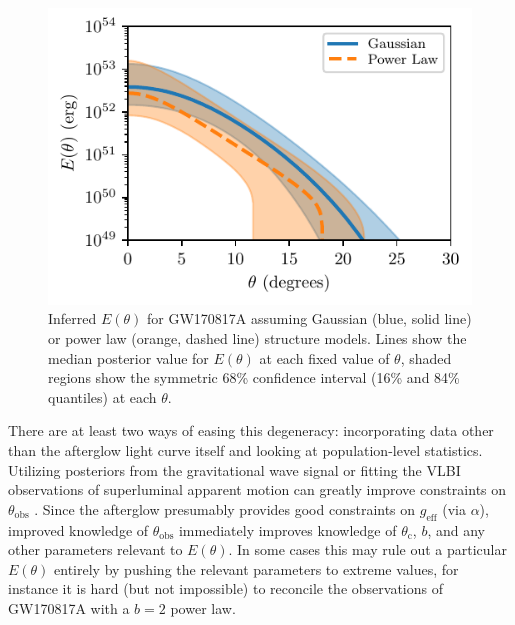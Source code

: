 \documentclass[twocolumn]{aastex62}
\newcommand{\gwbns}{GW170817A}
\newcommand{\thobs}{\ensuremath{\theta_{\mathrm{obs}}}}
\newcommand{\thC}{\ensuremath{\theta_{\mathrm{c}}}}
\newcommand{\geff}{\ensuremath{g_{\mathrm{eff}}}}
\begin{document}
\begin{figure}
	\includegraphics[width=\columnwidth]{figs/fit_E_theta.pdf}
	\caption{Inferred $E(\theta)$ for \gwbns{} assuming Gaussian (blue, solid line) or power law (orange, dashed line) structure models.  Lines show the median posterior value for $E(\theta)$ at each fixed value of $\theta$, shaded regions show the symmetric 68\% confidence interval (16\% and 84\% quantiles) at each $\theta$. \label{fig:fit_E_theta.pdf}}
\end{figure}

There are at least two ways of easing this degeneracy: incorporating data other than the afterglow light curve itself and looking at population-level statistics.  Utilizing posteriors from the gravitational wave signal or fitting the VLBI observations of superluminal apparent motion can greatly improve constraints on $\thobs$ \citep{Troja:2018aa, Hotokezaka:2018aa, Ghirlanda:2019aa}.  Since the afterglow presumably provides good constraints on $\geff$ (via $\alpha$), improved knowledge of $\thobs$ immediately improves knowledge of $\thC$, $b$, and any other parameters relevant to $E(\theta)$.  In some cases this may rule out a particular $E(\theta)$ entirely by pushing the relevant parameters to extreme values, for instance it is hard (but not impossible) to reconcile the observations of \gwbns{} with a $b=2$ power law.
\end{document}

